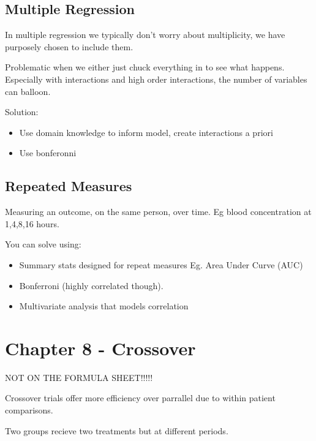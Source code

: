 \documentclass[
  letterpaper,
  DIV=11,
  numbers=noendperiod]{scrreprt}
\providecommand{\tightlist}{%
  \setlength{\itemsep}{0pt}\setlength{\parskip}{0pt}}\usepackage{longtable,booktabs,array}
\begin{document}
\hypertarget{multiple-regression}{%
\subsection{Multiple Regression}\label{multiple-regression}}

In multiple regression we typically don't worry about multiplicity, we
have purposely chosen to include them.

Problematic when we either just chuck everything in to see what happens.
Especially with interactions and high order interactions, the number of
variables can balloon.

Solution:

\begin{itemize}
\tightlist
\item
  Use domain knowledge to inform model, create interactions a priori
\item
  Use bonferonni
\end{itemize}

\hypertarget{repeated-measures}{%
\subsection{Repeated Measures}\label{repeated-measures}}

Measuring an outcome, on the same person, over time. Eg blood
concentration at 1,4,8,16 hours.

You can solve using:

\begin{itemize}
\tightlist
\item
  Summary stats designed for repeat measures Eg. Area Under Curve (AUC)
\item
  Bonferroni (highly correlated though).
\item
  Multivariate analysis that models correlation
\end{itemize}

\hypertarget{chapter-8---crossover}{%
\section{Chapter 8 - Crossover}\label{chapter-8---crossover}}

NOT ON THE FORMULA SHEET!!!!!

Crossover trials offer more efficiency over parrallel due to within
patient comparisons.

Two groups recieve two treatments but at different periods.
\end{document}
